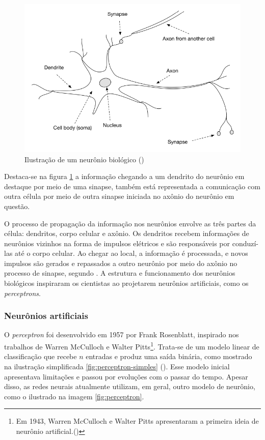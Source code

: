 \begin{figure}[H] 
  \includegraphics[width= 12cm]{../figuras/neuron.png}
  \caption{Ilustração de um neurônio biológico (\cite{dl-oreilly})}
  \label{fig:neuron}
\end{figure}

Destaca-se na figura \ref{fig:neuron} a informação chegando a um 
dendrito do neurônio em destaque
por meio de uma sinapse, também está representada a comunicação com outra célula
por meio de outra sinapse iniciada no axônio 
do neurônio em questão. 

O processo de propagação da informação nos neurônios 
envolve as três partes da célula: dendritos, corpo celular
e axônio.
Os dendritos recebem informações de neurônios vizinhos 
na forma de impulsos elétricos e são responsáveis 
por conduzí-las até o corpo celular. 
Ao chegar ao local, a informação é processada, e novos 
impulsos são gerados e repassados a outro neurônio 
por meio do axônio no processo de sinapse, segundo \cite{fund_deep_learning}.
A estrutura e funcionamento dos neurônios biológicos inspiraram
os cientistas ao projetarem neurônios artificiais, como 
os \textit{perceptrons}. 

\subsubsection{Neurônios artificiais}

O \textit{perceptron} foi desenvolvido em 1957 por Frank 
Rosenblatt, inspirado nos trabalhos de Warren McCulloch e Walter Pitts\footnote{Em 
1943, Warren McCulloch e Walter Pitts apresentaram a 
primeira ideia de neurônio artificial.(\cite{neuronio})}.
Trata-se de um modelo linear de classificação que 
recebe $n$ entradas e produz uma saída binária, como mostrado 
na ilustração simplificada \ref{fig:perceptron-simples} (\cite{deeplearningbook}).
Esse modelo inicial apresentava limitações e passou por evoluções com o passar do 
tempo. Apesar disso, as redes neurais atualmente utilizam, em geral,
outro modelo de neurônio, como o ilustrado na imagem \ref{fig:perceptron}.


